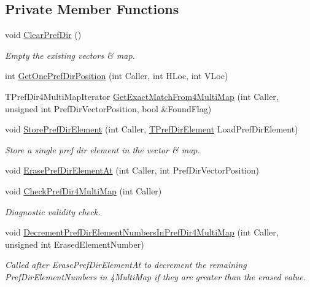 \subsection*{Private Member Functions}
\begin{DoxyCompactItemize}
\item 
\mbox{\label{class_t_one_pref_dir_ad2e6adb7b634b17cab9cd03610a0f8e3}} 
void \mbox{\hyperlink{class_t_one_pref_dir_ad2e6adb7b634b17cab9cd03610a0f8e3}{Clear\+Pref\+Dir}} ()
\begin{DoxyCompactList}\small\item\em Empty the existing vectors \& map. \end{DoxyCompactList}\item 
int \mbox{\hyperlink{class_t_one_pref_dir_a200fd1dc1cffc400160b8d2147278752}{Get\+One\+Pref\+Dir\+Position}} (int Caller, int H\+Loc, int V\+Loc)
\item 
T\+Pref\+Dir4\+Multi\+Map\+Iterator \mbox{\hyperlink{class_t_one_pref_dir_a8bc65b139325c45b57a9f43a9b3404a8}{Get\+Exact\+Match\+From4\+Multi\+Map}} (int Caller, unsigned int Pref\+Dir\+Vector\+Position, bool \&Found\+Flag)
\item 
\mbox{\label{class_t_one_pref_dir_ac5f8d2864f0510cf73cb9883b520ec9f}} 
void \mbox{\hyperlink{class_t_one_pref_dir_ac5f8d2864f0510cf73cb9883b520ec9f}{Store\+Pref\+Dir\+Element}} (int Caller, \mbox{\hyperlink{class_t_pref_dir_element}{T\+Pref\+Dir\+Element}} Load\+Pref\+Dir\+Element)
\begin{DoxyCompactList}\small\item\em Store a single pref dir element in the vector \& map. \end{DoxyCompactList}\item 
void \mbox{\hyperlink{class_t_one_pref_dir_aa191ffa7fa23838043d34d9b02cd7bcb}{Erase\+Pref\+Dir\+Element\+At}} (int Caller, int Pref\+Dir\+Vector\+Position)
\item 
\mbox{\label{class_t_one_pref_dir_a8a7ddf3981800ec0df1225c9e5aa52c2}} 
void \mbox{\hyperlink{class_t_one_pref_dir_a8a7ddf3981800ec0df1225c9e5aa52c2}{Check\+Pref\+Dir4\+Multi\+Map}} (int Caller)
\begin{DoxyCompactList}\small\item\em Diagnostic validity check. \end{DoxyCompactList}\item 
\mbox{\label{class_t_one_pref_dir_a056c475541b487ce13cb34dc43b1cf6f}} 
void \mbox{\hyperlink{class_t_one_pref_dir_a056c475541b487ce13cb34dc43b1cf6f}{Decrement\+Pref\+Dir\+Element\+Numbers\+In\+Pref\+Dir4\+Multi\+Map}} (int Caller, unsigned int Erased\+Element\+Number)
\begin{DoxyCompactList}\small\item\em Called after Erase\+Pref\+Dir\+Element\+At to decrement the remaining Pref\+Dir\+Element\+Numbers in 4\+Multi\+Map if they are greater than the erased value. \end{DoxyCompactList}\end{DoxyCompactItemize}
